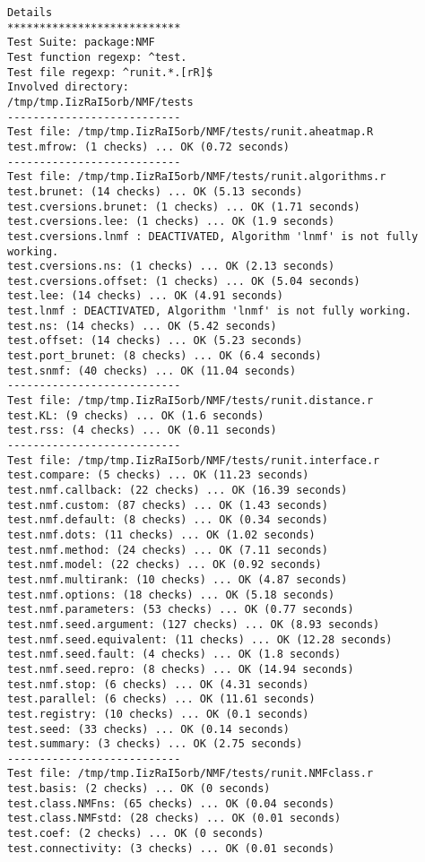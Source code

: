 \documentclass[10pt]{article}
\begin{document}
\begin{verbatim}
Details 
*************************** 
Test Suite: package:NMF 
Test function regexp: ^test. 
Test file regexp: ^runit.*.[rR]$ 
Involved directory: 
/tmp/tmp.IizRaI5orb/NMF/tests 
--------------------------- 
Test file: /tmp/tmp.IizRaI5orb/NMF/tests/runit.aheatmap.R 
test.mfrow: (1 checks) ... OK (0.72 seconds)
--------------------------- 
Test file: /tmp/tmp.IizRaI5orb/NMF/tests/runit.algorithms.r 
test.brunet: (14 checks) ... OK (5.13 seconds)
test.cversions.brunet: (1 checks) ... OK (1.71 seconds)
test.cversions.lee: (1 checks) ... OK (1.9 seconds)
test.cversions.lnmf : DEACTIVATED, Algorithm 'lnmf' is not fully working.
test.cversions.ns: (1 checks) ... OK (2.13 seconds)
test.cversions.offset: (1 checks) ... OK (5.04 seconds)
test.lee: (14 checks) ... OK (4.91 seconds)
test.lnmf : DEACTIVATED, Algorithm 'lnmf' is not fully working.
test.ns: (14 checks) ... OK (5.42 seconds)
test.offset: (14 checks) ... OK (5.23 seconds)
test.port_brunet: (8 checks) ... OK (6.4 seconds)
test.snmf: (40 checks) ... OK (11.04 seconds)
--------------------------- 
Test file: /tmp/tmp.IizRaI5orb/NMF/tests/runit.distance.r 
test.KL: (9 checks) ... OK (1.6 seconds)
test.rss: (4 checks) ... OK (0.11 seconds)
--------------------------- 
Test file: /tmp/tmp.IizRaI5orb/NMF/tests/runit.interface.r 
test.compare: (5 checks) ... OK (11.23 seconds)
test.nmf.callback: (22 checks) ... OK (16.39 seconds)
test.nmf.custom: (87 checks) ... OK (1.43 seconds)
test.nmf.default: (8 checks) ... OK (0.34 seconds)
test.nmf.dots: (11 checks) ... OK (1.02 seconds)
test.nmf.method: (24 checks) ... OK (7.11 seconds)
test.nmf.model: (22 checks) ... OK (0.92 seconds)
test.nmf.multirank: (10 checks) ... OK (4.87 seconds)
test.nmf.options: (18 checks) ... OK (5.18 seconds)
test.nmf.parameters: (53 checks) ... OK (0.77 seconds)
test.nmf.seed.argument: (127 checks) ... OK (8.93 seconds)
test.nmf.seed.equivalent: (11 checks) ... OK (12.28 seconds)
test.nmf.seed.fault: (4 checks) ... OK (1.8 seconds)
test.nmf.seed.repro: (8 checks) ... OK (14.94 seconds)
test.nmf.stop: (6 checks) ... OK (4.31 seconds)
test.parallel: (6 checks) ... OK (11.61 seconds)
test.registry: (10 checks) ... OK (0.1 seconds)
test.seed: (33 checks) ... OK (0.14 seconds)
test.summary: (3 checks) ... OK (2.75 seconds)
--------------------------- 
Test file: /tmp/tmp.IizRaI5orb/NMF/tests/runit.NMFclass.r 
test.basis: (2 checks) ... OK (0 seconds)
test.class.NMFns: (65 checks) ... OK (0.04 seconds)
test.class.NMFstd: (28 checks) ... OK (0.01 seconds)
test.coef: (2 checks) ... OK (0 seconds)
test.connectivity: (3 checks) ... OK (0.01 seconds)

\end{verbatim}
\end{document}
